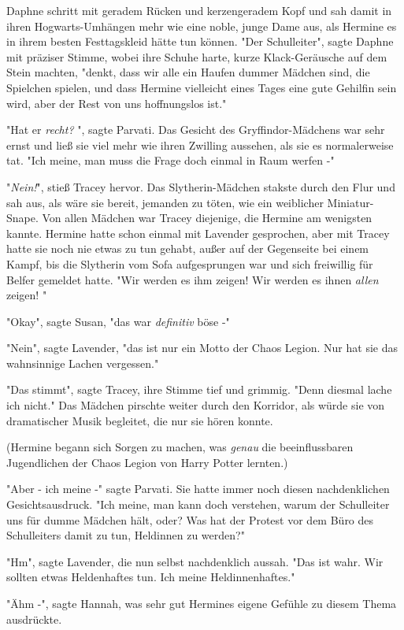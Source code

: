 {Daphne schritt mit geradem Rücken und kerzengeradem Kopf und sah damit in ihren Hogwarts-Umhängen mehr wie eine noble, junge Dame aus, als Hermine es in ihrem besten Festtagskleid hätte tun können. "Der Schulleiter", sagte Daphne mit präziser Stimme, wobei ihre Schuhe harte, kurze Klack-Geräusche auf dem Stein machten, "denkt, dass wir alle ein Haufen dummer Mädchen sind, die Spielchen spielen, und dass Hermine vielleicht eines Tages eine gute Gehilfin sein wird, aber der Rest von uns hoffnungslos ist."

"Hat er \emph{recht?} ", sagte Parvati. Das Gesicht des Gryffindor-Mädchens war sehr ernst und ließ sie viel mehr wie ihren Zwilling aussehen, als sie es normalerweise tat. "Ich meine, man muss die Frage doch einmal in Raum werfen -"

"\emph{Nein!}", stieß Tracey hervor. Das Slytherin-Mädchen stakste durch den Flur und sah aus, als wäre sie bereit, jemanden zu töten, wie ein weiblicher Miniatur-Snape. Von allen Mädchen war Tracey diejenige, die Hermine am wenigsten kannte. Hermine hatte schon einmal mit Lavender gesprochen, aber mit Tracey hatte sie noch nie etwas zu tun gehabt, außer auf der Gegenseite bei einem Kampf, bis die Slytherin vom Sofa aufgesprungen war und sich freiwillig für Belfer gemeldet hatte. "Wir werden es ihm zeigen! Wir werden es ihnen \emph{allen} zeigen! "

"Okay", sagte Susan, "das war \emph{definitiv} böse -"

"Nein", sagte Lavender, "das ist nur ein Motto der Chaos Legion. Nur hat sie das wahnsinnige Lachen vergessen."

"Das stimmt", sagte Tracey, ihre Stimme tief und grimmig. "Denn diesmal lache ich nicht." Das Mädchen pirschte weiter durch den Korridor, als würde sie von dramatischer Musik begleitet, die nur sie hören konnte.

(Hermine begann sich Sorgen zu machen, was \emph{genau} die beeinflussbaren Jugendlichen der Chaos Legion von Harry Potter lernten.)

"Aber - ich meine -" sagte Parvati. Sie hatte immer noch diesen nachdenklichen Gesichtsausdruck. "Ich meine, man kann doch verstehen, warum der Schulleiter uns für dumme Mädchen hält, oder? Was hat der Protest vor dem Büro des Schulleiters damit zu tun, Heldinnen zu werden?"

"Hm", sagte Lavender, die nun selbst nachdenklich aussah. "Das ist wahr. Wir sollten etwas Heldenhaftes tun. Ich meine Heldinnenhaftes."

"Ähm -", sagte Hannah, was sehr gut Hermines eigene Gefühle zu diesem Thema ausdrückte.

}
